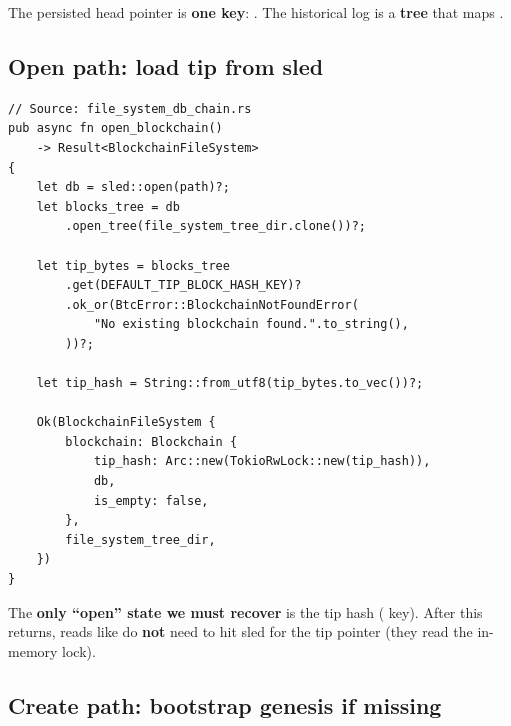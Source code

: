 \begin{notebox}
The persisted head pointer is \textbf{one key}: . The historical log is a \textbf{tree} that maps .
\end{notebox}

\subsection{Open path: load tip from sled}
\label{sec:ch09-3-open-path}

\begin{listing}[H]
\caption{}
\label{lst:ch09-3-10}
\begin{verbatim}
// Source: file_system_db_chain.rs
pub async fn open_blockchain()
    -> Result<BlockchainFileSystem>
{
    let db = sled::open(path)?;
    let blocks_tree = db
        .open_tree(file_system_tree_dir.clone())?;

    let tip_bytes = blocks_tree
        .get(DEFAULT_TIP_BLOCK_HASH_KEY)?
        .ok_or(BtcError::BlockchainNotFoundError(
            "No existing blockchain found.".to_string(),
        ))?;

    let tip_hash = String::from_utf8(tip_bytes.to_vec())?;

    Ok(BlockchainFileSystem {
        blockchain: Blockchain {
            tip_hash: Arc::new(TokioRwLock::new(tip_hash)),
            db,
            is_empty: false,
        },
        file_system_tree_dir,
    })
}
\end{verbatim}
\end{listing}

\begin{checkpointbox}
The \textbf{only ``open'' state we must recover} is the tip hash ( key). After this returns, reads like  do \textbf{not} need to hit sled for the tip pointer (they read the in-memory lock).
\end{checkpointbox}

\subsection{Create path: bootstrap genesis if missing}
\label{sec:ch09-3-create-path}

